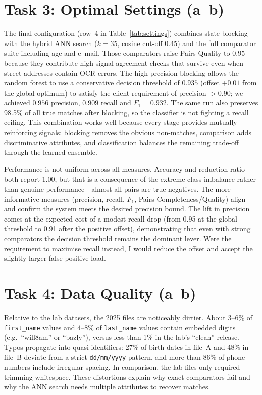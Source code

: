 \documentclass[11pt]{article}
\begin{document}
\section*{Task 3: Optimal Settings (a--b)}
The final configuration (row~4 in Table~\ref{tab:settings}) combines state blocking with the hybrid ANN search ($k{=}35$, cosine cut-off $0.45$) and the full comparator suite including age and e--mail. Those comparators raise Pairs Quality to $0.95$ because they contribute high-signal agreement checks that survive even when street addresses contain OCR errors. The high precision blocking allows the random forest to use a conservative decision threshold of $0.935$ (offset $+0.01$ from the global optimum) to satisfy the client requirement of precision ${>}0.90$; we achieved $0.956$ precision, $0.909$ recall and $F_{1}=0.932$. The same run also preserves 98.5\% of all true matches after blocking, so the classifier is not fighting a recall ceiling. This combination works well because every stage provides mutually reinforcing signals: blocking removes the obvious non-matches, comparison adds discriminative attributes, and classification balances the remaining trade-off through the learned ensemble.

Performance is not uniform across all measures. Accuracy and reduction ratio both report 1.00, but that is a consequence of the extreme class imbalance rather than genuine performance---almost all pairs are true negatives. The more informative measures (precision, recall, $F_{1}$, Pairs Completeness/Quality) align and confirm the system meets the desired precision bound. The lift in precision comes at the expected cost of a modest recall drop (from 0.95 at the global threshold to 0.91 after the positive offset), demonstrating that even with strong comparators the decision threshold remains the dominant lever. Were the requirement to maximise recall instead, I would reduce the offset and accept the slightly larger false-positive load.

\section*{Task 4: Data Quality (a--b)}
Relative to the lab datasets, the 2025 files are noticeably dirtier. About 3--6\% of \texttt{first\_name} values and 4--8\% of \texttt{last\_name} values contain embedded digits (e.g.\ ``will8am'' or ``bazly''), versus less than 1\% in the lab's ``clean'' release. Typos propagate into quasi-identifiers: 27\% of birth dates in file~A and 48\% in file~B deviate from a strict \texttt{dd/mm/yyyy} pattern, and more than 86\% of phone numbers include irregular spacing. In comparison, the lab files only required trimming whitespace. These distortions explain why exact comparators fail and why the ANN search needs multiple attributes to recover matches.
\end{document}
